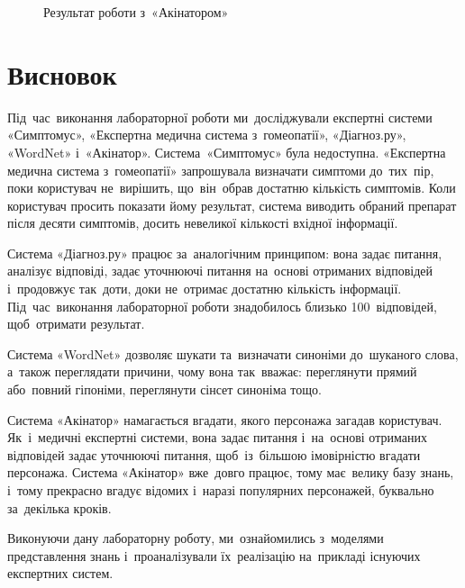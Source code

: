 \documentclass[
  a4paper,
  oneside,
  BCOR = 10mm,
  DIV = 12,
  12pt,
  headings = normal,
]{scrartcl}
\newlength{\gridunitwidth}
\begin{document}
\begin{figure}[!htbp]
\begin{subfigure}[b]{6 \gridunitwidth - 1em /2}
          \caption{}
          \label{subfig:akinator-04}
        \end{subfigure}%
        \caption{Результат роботи з~«Акінатором»}
        \label{fig:akinator}
      \end{figure}

  \section{Висновок}
    Під~час~виконання лабораторної роботи ми~досліджували експертні системи «Симптомус», «Експертна медична система з~гомеопатії», «Діагноз.ру», «\textenglish{WordNet}» і~«Акінатор». Система «Симптомус» була недоступна. «Експертна медична система з~гомеопатії» запрошувала визначати симптоми до~тих~пір, поки користувач не~вирішить, що~він~обрав достатню кількість симптомів. Коли користувач просить показати йому результат, система виводить обраний препарат після десяти симптомів, досить невеликої кількості вхідної інформації.

    Система «Діагноз.ру» працює за~аналогічним принципом: вона задає питання, аналізує відповіді, задає уточнюючі питання на~основі отриманих відповідей і~продовжує так~доти, доки не~отримає достатню кількість інформації. Під~час~виконання лабораторної роботи знадобилось близько 100~відповідей, щоб~отримати результат.

    Система «\textenglish{WordNet}» дозволяє шукати та~визначати синоніми до~шуканого слова, а~також переглядати причини, чому вона так~вважає: переглянути прямий або~повний гіпоніми, переглянути сінсет синоніма тощо.

    Система «Акінатор» намагається вгадати, якого персонажа загадав користувач. Як~і~медичні експертні системи, вона задає питання і~на~основі отриманих відповідей задає уточнюючі питання, щоб~із~більшою імовірністю вгадати персонажа. Система «Акінатор» вже~довго працює, тому має~велику базу знань, і~тому прекрасно вгадує відомих і~наразі популярних персонажей, буквально за~декілька кроків.

    Виконуючи дану лабораторну роботу, ми~ознайомились з~моделями представлення знань і~проаналізували їх~реалізацію на~прикладі існуючих експертних систем.
\end{document}
